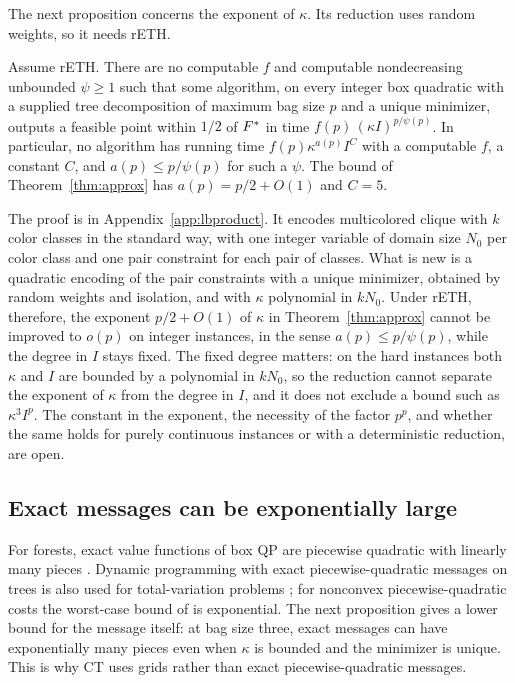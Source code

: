 The next proposition concerns the exponent of $\kappa$. Its reduction uses
random weights, so it needs rETH.

\begin{proposition}
\label{prop:lbproduct}
Assume rETH. There are no computable $f$ and computable nondecreasing
unbounded $\psi\ge1$ such that some algorithm, on every integer box quadratic
with a supplied tree decomposition of maximum bag size $p$ and a unique
minimizer, outputs a feasible point within $1/2$ of $F^{*}$ in time
$f(p)\,(\kappa I)^{p/\psi(p)}$. In particular, no algorithm has running time
$f(p)\kappa^{a(p)}I^C$ with a computable $f$, a constant $C$, and
$a(p)\le p/\psi(p)$ for such a $\psi$. The bound of
Theorem~\ref{thm:approx} has $a(p)=p/2+O(1)$ and $C=5$.
\end{proposition}

The proof is in Appendix~\ref{app:lbproduct}. It encodes multicolored clique
with $k$ color classes in the standard way, with one integer variable of
domain size $N_0$ per color class and one pair constraint for each pair of
classes. What is new is a
quadratic encoding of the pair constraints with a unique minimizer, obtained
by random weights and isolation, and with $\kappa$ polynomial in $kN_0$.
Under rETH, therefore, the exponent $p/2+O(1)$ of $\kappa$ in
Theorem~\ref{thm:approx} cannot be improved to $o(p)$ on integer instances,
in the sense $a(p)\le p/\psi(p)$, while the degree in $I$ stays fixed. The
fixed degree matters: on the hard instances both $\kappa$ and $I$ are bounded
by a polynomial in $kN_0$, so the reduction cannot separate the exponent of
$\kappa$ from the degree in $I$, and it does not exclude a bound such as
$\kappa^3I^p$. The constant in the
exponent, the necessity of the factor $p^p$, and whether the same holds for
purely continuous instances or with a deterministic reduction, are open.

\subsection{Exact messages can be exponentially large}
\label{sec:limits-messages}

For forests, exact value functions of box QP are piecewise quadratic with
linearly many pieces \cite{DelPiaKhajavirad2026}. Dynamic programming with
exact piecewise-quadratic messages on trees is also used for total-variation
problems \cite{KolmogorovPockRolinek2016,KuricAhmetspahicPock2024}; for
nonconvex piecewise-quadratic costs the worst-case bound of
\cite{KuricAhmetspahicPock2024} is exponential. The next proposition gives a
lower bound for the message itself: at bag size three, exact messages can have
exponentially many pieces even when $\kappa$ is bounded and the minimizer is
unique. This is why CT uses grids rather than exact piecewise-quadratic
messages.

